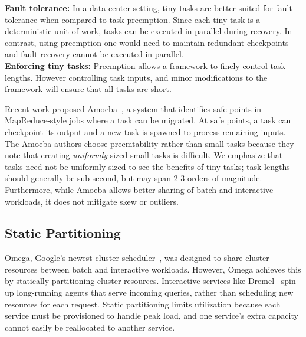 \textbf{Fault tolerance:} In a data center setting, tiny tasks are better suited for
fault tolerance when compared to task preemption. Since each tiny task is a
deterministic unit of work, tasks can be executed in parallel during recovery.
In contrast, using preemption one would need to maintain redundant checkpoints
and fault recovery cannot be executed in parallel. \\

\textbf{Enforcing tiny tasks:} Preemption allows a framework to finely control
task lengths. However controlling task inputs, and minor modifications to the
framework will ensure that all tasks are short.

Recent work proposed Amoeba~\cite{ananthanarayanan2012true}, a system that identifies safe points in MapReduce-style
jobs where a task can be migrated. At safe points, a task can checkpoint its
output and a new task is spawned to process remaining inputs. The Amoeba authors
choose preemtability rather than small tasks because they note that creating
\emph{uniformly} sized small tasks is difficult. We emphasize that tasks need
not be uniformly sized to see the benefits of tiny tasks; task lengths
should generally be sub-second, but may span 2-3 orders of magnitude.
Furthermore, while Amoeba allows better sharing of batch and interactive
workloads, it does not mitigate skew or outliers.

\subsection{Static Partitioning}
Omega, Google's newest cluster scheduler~\cite{melnik2010dremel},
was designed to share cluster
resources between batch and interactive workloads. However, Omega achieves
this by
statically partitioning cluster resources.
Interactive services like Dremel~\cite{melnik2010dremel} spin up long-running
agents that serve incoming queries, rather than scheduling new resources for
each request.  Static partitioning limits utilization because each service
must be provisioned to handle peak load, and one service's extra capacity
cannot easily be reallocated to another service.

